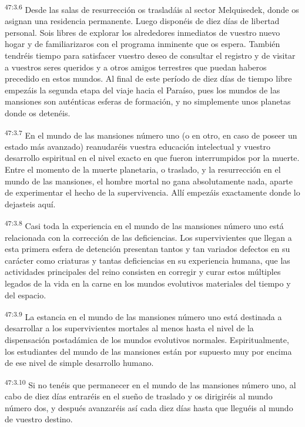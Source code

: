 \par
\textsuperscript{47:3.6} Desde las salas de resurrección os trasladáis al sector Melquisedek, donde os asignan una residencia permanente. Luego disponéis de diez días de libertad personal. Sois libres de explorar los alrededores inmediatos de vuestro nuevo hogar y de familiarizaros con el programa inminente que os espera. También tendréis tiempo para satisfacer vuestro deseo de consultar el registro y de visitar a vuestros seres queridos y a otros amigos terrestres que puedan haberos precedido en estos mundos. Al final de este período de diez días de tiempo libre empezáis la segunda etapa del viaje hacia el Paraíso, pues los mundos de las mansiones son auténticas esferas de formación, y no simplemente unos planetas donde os detenéis.

\par
\textsuperscript{47:3.7} En el mundo de las mansiones número uno (o en otro, en caso de poseer un estado más avanzado) reanudaréis vuestra educación intelectual y vuestro desarrollo espiritual en el nivel exacto en que fueron interrumpidos por la muerte. Entre el momento de la muerte planetaria, o traslado, y la resurrección en el mundo de las mansiones, el hombre mortal no gana absolutamente nada, aparte de experimentar el hecho de la supervivencia. Allí empezáis exactamente donde lo dejasteis aquí.

\par
\textsuperscript{47:3.8} Casi toda la experiencia en el mundo de las mansiones número uno está relacionada con la corrección de las deficiencias. Los supervivientes que llegan a esta primera esfera de detención presentan tantos y tan variados defectos en su carácter como criaturas y tantas deficiencias en su experiencia humana, que las actividades principales del reino consisten en corregir y curar estos múltiples legados de la vida en la carne en los mundos evolutivos materiales del tiempo y del espacio.

\par
\textsuperscript{47:3.9} La estancia en el mundo de las mansiones número uno está destinada a desarrollar a los supervivientes mortales al menos hasta el nivel de la dispensación postadámica de los mundos evolutivos normales. Espiritualmente, los estudiantes del mundo de las mansiones están por supuesto muy por encima de ese nivel de simple desarrollo humano.

\par
\textsuperscript{47:3.10} Si no tenéis que permanecer en el mundo de las mansiones número uno, al cabo de diez días entraréis en el sueño de traslado y os dirigiréis al mundo número dos, y después avanzaréis así cada diez días hasta que lleguéis al mundo de vuestro destino.

